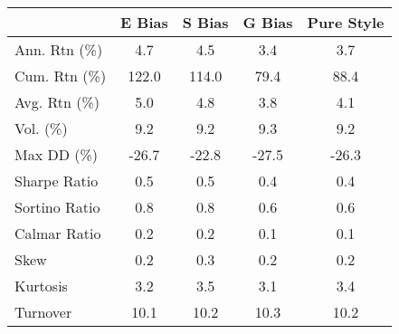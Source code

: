 \begin{tabular}{lcccc}
\toprule
 & E Bias & S Bias & G Bias & Pure Style \\
\midrule
Ann. Rtn (\%) & 4.7 & 4.5 & 3.4 & 3.7 \\
Cum. Rtn (\%) & 122.0 & 114.0 & 79.4 & 88.4 \\
Avg. Rtn (\%) & 5.0 & 4.8 & 3.8 & 4.1 \\
Vol. (\%) & 9.2 & 9.2 & 9.3 & 9.2 \\
Max DD (\%) & -26.7 & -22.8 & -27.5 & -26.3 \\
Sharpe Ratio & 0.5 & 0.5 & 0.4 & 0.4 \\
Sortino Ratio & 0.8 & 0.8 & 0.6 & 0.6 \\
Calmar Ratio & 0.2 & 0.2 & 0.1 & 0.1 \\
Skew & 0.2 & 0.3 & 0.2 & 0.2 \\
Kurtosis & 3.2 & 3.5 & 3.1 & 3.4 \\
Turnover & 10.1 & 10.2 & 10.3 & 10.2 \\
\bottomrule
\end{tabular}
